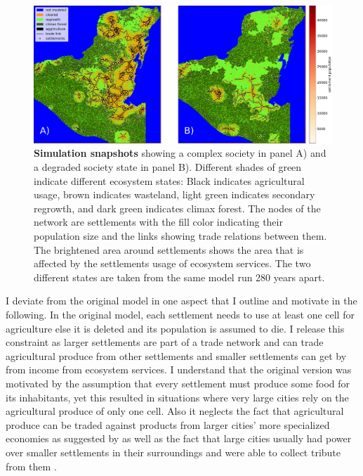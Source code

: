 \begin{figure}[!t]
\centering
\includegraphics[width=\textwidth]{figures/map_plots.pdf}
\caption[Simulation snapshots of the MayaSim model]{\textbf{Simulation snapshots} showing a complex society in panel A) and a degraded society state in panel B). Different shades of green indicate different ecosystem states: Black indicates agricultural usage, brown indicates wasteland, light green indicates secondary regrowth, and dark green indicates climax forest. The nodes of the network are settlements with the fill color indicating their population size and the links showing trade relations between them. The brightened area around settlements shows the area that is affected by the settlements usage of ecosystem services. The two different states are taken from the same model run 280 years apart.}
\label{fig:model_snapshot}
\end{figure}

I deviate from the original model in one aspect that I outline and motivate in the following.
In the original model, each settlement needs to use at least one cell for agriculture else it is deleted and its population is assumed to die. I release this constraint as larger settlements are part of a trade network and can trade agricultural produce from other settlements and smaller settlements can get by from income from ecosystem services. I understand that the original version was motivated by the assumption that every settlement must produce some food for its inhabitants, yet this resulted in situations where very large cities rely on the agricultural produce of only one cell. Also it neglects the fact that agricultural produce can be traded against products from larger cities' more specialized economies as suggested by \cite{Dahlin2007} as well as the fact that large cities usually had power over smaller settlements in their surroundings and were able to collect tribute from them \cite{Hendon1991}.

